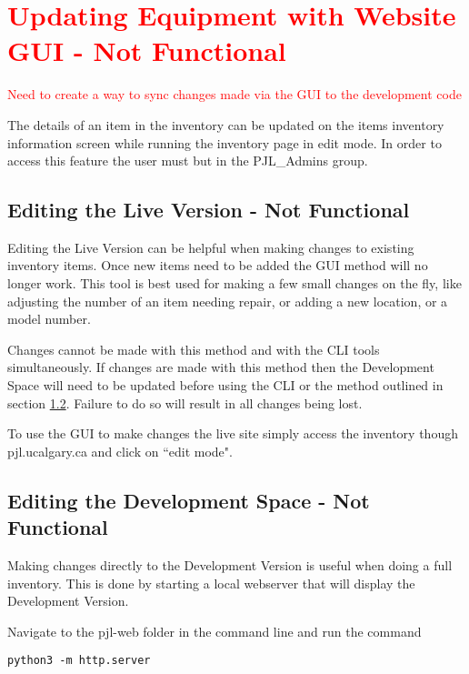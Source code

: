 \documentclass[justified]{LabArx3_5_1}
\begin{document}
\section{\textcolor{red}{Updating Equipment with Website GUI - Not Functional}}\label{sec:invGui}

\textcolor{red}{Need to create a way to sync changes made via the GUI to the development code}

The details of an item in the inventory can be updated on the items inventory information screen while running the inventory page in edit mode. In order to access this feature the user must but in the PJL_Admins group.

\subsection{Editing the Live Version - Not Functional}

Editing the Live Version can be helpful when making changes to existing inventory items. Once new items need to be added the GUI method will no longer work. This tool is best used for making a few small changes on the fly, like adjusting the number of an item needing repair, or adding a new location, or a model number. 

Changes cannot be made with this method and with the CLI tools simultaneously. If changes are made with this method then the Development Space will need to be updated before using the CLI or the method outlined in section \ref{sub:guiDev}. Failure to do so will result in all changes being lost. 

To use the GUI to make changes the live site simply access the inventory though pjl.ucalgary.ca and click on ``edit mode". 


\subsection{Editing the Development Space - Not Functional}\label{sub:guiDev}

Making changes directly to the Development Version is useful when doing a full inventory. This is done by starting a local webserver that will display the Development Version.

Navigate to the pjl-web folder in the command line and run the command

\begin{lstlisting}
python3 -m http.server       
\end{lstlisting}
\end{document}
